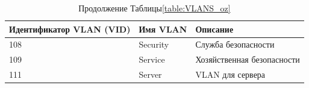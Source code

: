 \begin{table}[H]
    \centering
	\caption{Продолжение Таблицы\;\ref{table:VLANS_oz}}
    \small
	\begin{tabularx}{\textwidth}{|X|X|X|}
        \hline
		Идентификатор VLAN (VID)& Имя VLAN & Описание \\ \hline
        108     & Security      	& Служба безопасности           \\ \hline
		109     & Service       	& Хозяйственная безопасности    \\ \hline
		111		& Server			& VLAN для сервера				\\ \hline
    \end{tabularx}
\end{table}

